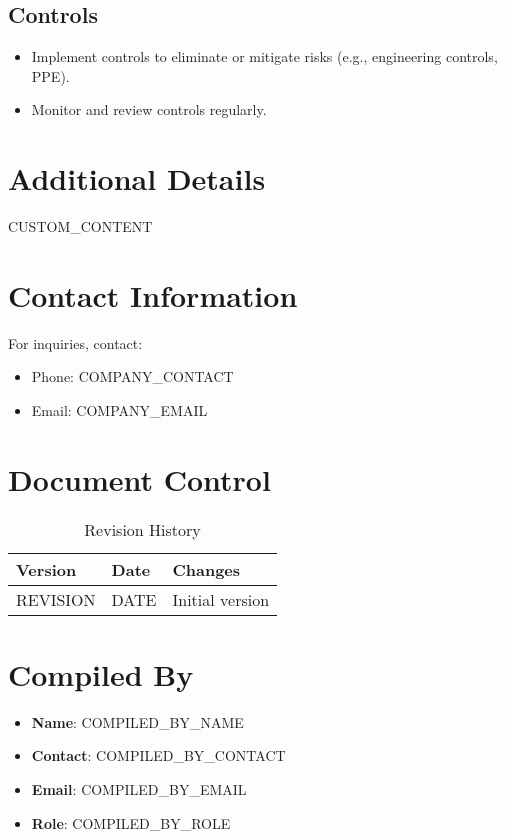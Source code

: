 \documentclass[12pt]{article}
\begin{document}
\subsection{Controls}
\begin{itemize}
    \item Implement controls to eliminate or mitigate risks (e.g., engineering controls, PPE).
    \item Monitor and review controls regularly.
\end{itemize}

\section{Additional Details}
{{CUSTOM_CONTENT}}

\section{Contact Information}
For inquiries, contact:
\begin{itemize}
    \item Phone: {{COMPANY_CONTACT}}
    \item Email: {{COMPANY_EMAIL}}
\end{itemize}

\section{Document Control}
\begin{table}[h]
    \centering
    \begin{tabular}{p{3cm}p{3cm}p{6cm}}
        \toprule
        \textbf{Version} & \textbf{Date} & \textbf{Changes} \\
        \midrule
        {{REVISION}} & {{DATE}} & Initial version \\
        \bottomrule
    \end{tabular}
    \caption{Revision History}
\end{table}

\section{Compiled By}
\begin{itemize}
    \item \textbf{Name}: {{COMPILED_BY_NAME}}
    \item \textbf{Contact}: {{COMPILED_BY_CONTACT}}
    \item \textbf{Email}: {{COMPILED_BY_EMAIL}}
    \item \textbf{Role}: {{COMPILED_BY_ROLE}}
\end{itemize}
\end{document}
